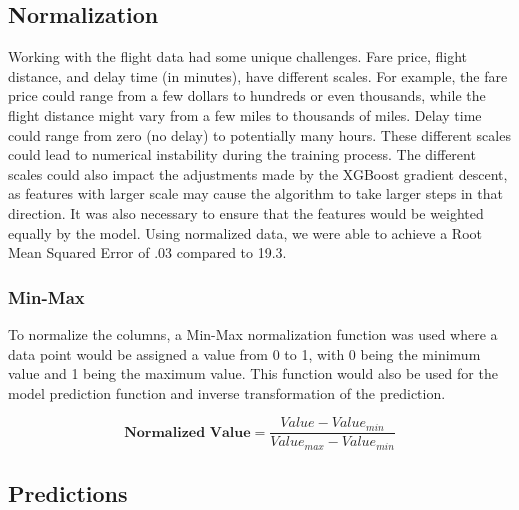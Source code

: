 \documentclass{article}
\begin{document}
    \subsection{Normalization}
    Working with the flight data had some unique challenges. Fare price, flight distance, and delay time (in minutes), have different scales. For example, the fare price could range from a few dollars to hundreds or even thousands, while the flight distance might vary from a few miles to thousands of miles. Delay time could range from zero (no delay) to potentially many hours. These different scales could lead to numerical instability during the training process. The different scales could also impact the adjustments made by the XGBoost gradient descent, as features with larger scale may cause the algorithm to take larger steps in that direction. It was also necessary to ensure that the features would be weighted equally by the model. Using normalized data, we were able to achieve a Root Mean Squared Error of .03 compared to 19.3.
    
    \subsubsection{Min-Max}

    To normalize the columns, a Min-Max normalization function was used where a data point would be assigned a value from 0 to 1, with 0 being the minimum value and 1 being the maximum value. This function would also be used for the model prediction function and inverse transformation of the prediction. 

    $$\textbf{Normalized Value} =\frac{Value-Value_{min}}{Value_{max}-Value_{min}} $$

    \subsection{Predictions}
\end{document}
